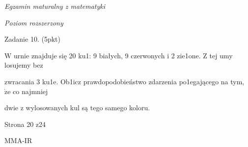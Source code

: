 \documentclass[a4paper,12pt]{article}
\begin{document}
{\it Egzamin maturalny z matematyki}

{\it Poziom rozszerzony}

Zadanie 10. (5pkt)

$\mathrm{W}$ urnie znajduje się 20 ku1: 9 białych, 9 czerwonych i 2 zie1one. $\mathrm{Z}$ tej umy losujemy bez

zwracania 3 ku1e. Ob1icz prawdopodobieństwo zdarzenia po1egającego na tym, $\dot{\mathrm{z}}\mathrm{e}$ co najmniej

dwie z wylosowanych kul są tego samego koloru.

Strona 20 z24

MMA-IR
\end{document}
